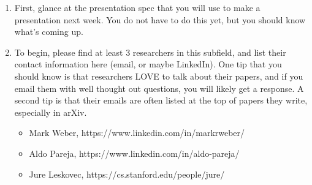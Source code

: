 \documentclass[letterpaper,11pt]{article}
\begin{document}
\begin{enumerate}
    \item First, glance at the presentation spec that you will use to make a presentation next week. You do not have to do this yet, but you should know what's coming up.
    \item 
    To begin, please find at least 3 researchers in this subfield, and list their contact information here (email, or maybe LinkedIn). One tip that you should know is that researchers LOVE to talk about their papers, and if you email them with well thought out questions, you will likely get a response. A second tip is that their emails are often listed at the top of papers they write, especially in arXiv.
\begin{tcolorbox}
  \begin{itemize}
    \item Mark Weber, https://www.linkedin.com/in/markrweber/
    \item Aldo Pareja, https://www.linkedin.com/in/aldo-pareja/
    \item Jure Leskovec, https://cs.stanford.edu/people/jure/
  \end{itemize}
\end{tcolorbox}


\end{enumerate}
\end{document}
